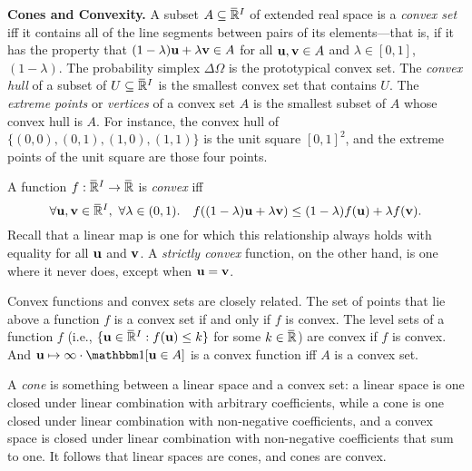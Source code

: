 \textbf{Cones and Convexity.}
A subset $A \subseteq \mskip1mu\overline{\mskip-1mu\mathbb R\!}\,^I$ of extended real space is a \emph{convex set} iff
it contains all of the line segments between pairs of its elements---that is, if
it has the property that
$
(1-\lambda) \mathbf u + \lambda \mathbf v \in A
$
for all $\mathbf u, \mathbf v \in A$ and $\lambda \in [0,1]$,
$(1-\lambda)$.
The probability simplex $\Delta \Omega$ is the prototypical convex set. 
The \emph{convex hull} of a subset of $U \subseteq \mskip1mu\overline{\mskip-1mu\mathbb R\!}\,^I$ is the smallest convex set that contains $U$. 
The \emph{extreme points} or \emph{vertices} of a convex set $A$ is the smallest subset 
of $A$ whose convex hull is $A$. 
For instance, the convex hull of $\{ (0,0), (0,1), (1,0), (1,1) \}$
is the unit square $[0,1]^2$, and the extreme points of the unit square are those four points. 

%
A function $f : \mskip1mu\overline{\mskip-1mu\mathbb R\!}\,^I \to \mskip1mu\overline{\mskip-1mu\mathbb R\!}\,$ is \emph{convex} iff
\[
    \forall \mathbf u, \mathbf v \in \mskip1mu\overline{\mskip-1mu\mathbb R\!}\,^I,~\forall \lambda \in (0,1).\quad
    f( (1-\lambda) \mathbf u + \lambda \mathbf v ) \le (1-\lambda) f(\mathbf u) + \lambda f(\mathbf v).
\]
Recall that a linear map is one for which this relationship always holds with equality for all $\mathbf u$ and $\mathbf v$. 
A \emph{strictly convex} function, on the other hand, is one where it never does, except when $\mathbf u = \mathbf v$. 

Convex functions and convex sets are closely related. The set of points that lie above a function $f$
is a convex set if and only if $f$ is convex. The level sets of a function $f$ (i.e., $\{ \mathbf u \in \mskip1mu\overline{\mskip-1mu\mathbb R\!}\,^I : f(\mathbf u) \le k \}$ for some $k \in \mskip1mu\overline{\mskip-1mu\mathbb R\!}\,$) are convex if $f$ is convex. 
And $\mat u \mapsto \infty \cdot \mathbbm 1[\mat u \in A]$ is a convex function iff $A$ is a convex set. 

A \emph{cone} is something between a linear space and a convex set: a linear space is one closed under linear combination with arbitrary coefficients, while a cone is one closed under linear combination with non-negative coefficients, and a convex space is closed under linear combination with non-negative coefficients that sum to one.
It follows that linear spaces are cones, and cones are convex.



